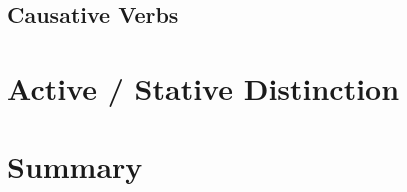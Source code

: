 \documentclass[10pt,a4paper]{article} %
\begin{document}
\subsection{Causative Verbs}


    \section{Active / Stative Distinction}


     \section{Summary}





    \nocite{*}
    
    
\end{document}
